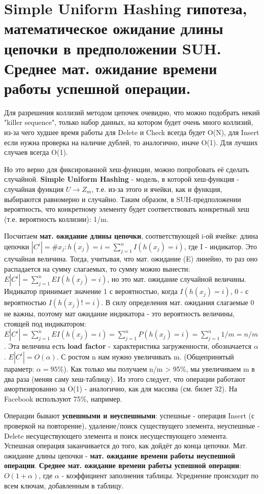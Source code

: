 \section{Simple Uniform Hashing гипотеза, математическое ожидание длины цепочки в предположении SUH. Среднее мат. ожидание времени работы успешной операции.}
Для разрешения коллизий методом цепочек очевидно, что можно подобрать некий "killer sequence", только набор данных, на котором будет очень много коллизий, из-за чего худшее время работы для Delete и Check всегда будет O(N), для Insert если нужна проверка на наличие дублей, то аналогично, иначе O(1). Для лучших случаев всегда O(1). \par
Но это верно для фиксированной хеш-функции, можно попробовать её сделать случайной. \textbf{Simple Uniform Hashing} - модель, в которой хеш-функция - случайная функция $U \rightarrow Z_m$, т.е. из-за этого и ячейки, как и функция, выбираются равномерно и случайно. Таким образом, в SUH-предположении вероятность, что конкретному элементу будет соответствовать конкретный хеш (т.е. вероятность коллизии): 1/m. \par
Посчитаем \textbf{мат. ожидание длины цепочки}, соответствующей i-ой ячейке: длина цепочки $|C^i| = \# x_j: h(x_j) = i = \sum_{j=1}^n I(h(x_j) = i)$, где I - индикатор. Это случайная величина. Тогда, учитывая, что мат. ожидание (E) линейно, то раз оно распадается на сумму слагаемых, то сумму можно вынести: $E|C^i| = \sum_{j=1}^n E I(h(x_j) = i)$, но это мат. ожидание случайной величины. Индикатор принимает значение 1 с вероятностью, когда $I(h(x_j) = i)$, 0 - с вероятностью $I(h(x_j) != i)$. В силу определения мат. ожидания слагаемые 0 не важны, поэтому мат ожидание индикатора - это вероятность величины, стоящей под индикатором: $E|C^i| = \sum_{j=1}^n E I(h(x_j) = i) = \sum_{j=1}^n P(h(x_j) = i) = \sum_{j=1}^n 1/m = n/m$. Эта величина есть \textbf{load factor} - характеристика загруженности, обозначается $\alpha$. $E|C^i| = O(\alpha)$. С ростом n нам нужно увеличивать m. (Общепринятый параметр: $\alpha = 95\%$). Как только мы получаем n/m > 95\%, мы увеличиваем m в два раза (меняя саму хеш-таблицу). Из этого следует, что операции работают амортизированно за O(1) - аналогично, как для массива (см. билет 32). На Facebook используют 75\%, например. \par
Операции бывают \textbf{успешными и неуспешными}: успешные - операция Insert (с проверкой на повторение), удаление/поиск существущего элемента, неуспешные - Delete несуществующего элемента и поиск несуществующего элемента. Успешная операция заканчивается до того, как дойдёт до конца цепочки. Мат. ожидание длины цепочки - \textbf{мат. ожидание времени работы неуспешной операции}. \textbf{Среднее мат. ожидание времени работы успешной операции}: $O(1+\alpha)$, где $\alpha$ - коэффициент заполнения таблицы. Усреднение происходит по всем ключам, добавленным в таблицу. \par
